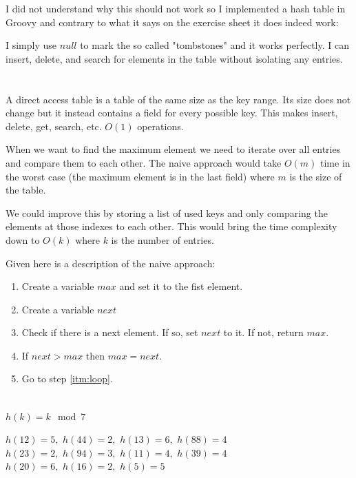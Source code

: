\documentclass[12pt]{article}
\begin{document}
I did not understand why this should not work so I implemented a hash table in Groovy and contrary to what it says on the exercise sheet it does indeed work:



I simply use $null$ to mark the so called "tombstones" and it works perfectly. I can insert, delete, and search for elements in the table without isolating any entries.

\section{} %
A direct access table is a table of the same size as the key range. Its size does not change but it instead contains a field for every possible key. This makes insert, delete, get, search, etc. $O(1)$ operations.

When we want to find the maximum element we need to iterate over all entries and compare them to each other. The naive approach would take $O(m)$ time in the worst case (the maximum element is in the last field) where $m$ is the size of the table.

We could improve this by storing a list of used keys and only comparing the elements at those indexes to each other. This would bring the time complexity down to $O(k)$ where $k$ is the number of entries.

Given here is a description of the naive approach:

\begin{enumerate}
	\item Create a variable $max$ and set it to the fist element.
	\item Create a variable $next$
	\item \label{itm:loop} Check if there is a next element. If so, set $next$ to it. If not, return $max$.
	\item If $next > max$ then $max = next$.
	\item Go to step \ref{itm:loop}.
\end{enumerate}

\section{} %
$h(k) = k \mod 7$

$h(12) = 5,$ $h(44) = 2,$ $h(13) = 6,$ $h(88) = 4$\\
$h(23) = 2,$ $h(94) = 3,$ $h(11) = 4,$ $h(39) = 4$\\
$h(20) = 6,$ $h(16) = 2,$ $h(5) = 5$
\end{document}
